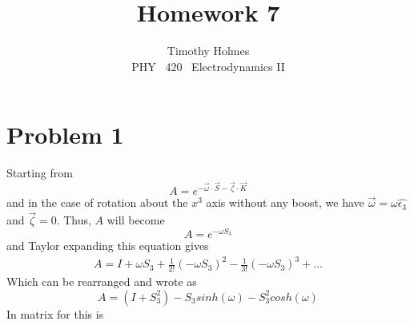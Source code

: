 \documentclass[11pt]{article}
\newcommand{\HWnum}{7}
\newcommand{\CourseNum}{420}           %
\newcommand{\Subject}{PHY}
\begin{document}

\title{Homework {\HWnum}}
\author{Timothy Holmes \\ \Subject ~ \CourseNum ~ Electrodynamics II}

\maketitle

\section*{Problem 1}

Starting from 
$$
A = e^{-\vec{\omega} \cdot \vec{S} - \vec{\zeta} \cdot \vec{K}}
$$
and in the case of rotation about the $x^{3}$ axis without any boost, we have $\vec{\omega} = \omega \hat{\epsilon_{3}}$ and $\vec{\zeta} = 0$. Thus, $A$ will become
$$
A = e^{-\omega S_{3}}
$$
and Taylor expanding this equation gives
\begin{align*}
    A = I + \omega S_{3} + \frac{1}{2!}(-\omega S_{3})^{2} - \frac{1}{3!}(-\omega S_{3})^{3} + ...
\end{align*}
Which can be rearranged and wrote as
$$
A = (I + S_{3}^{2}) - S_{3}sinh(\omega) - S_{3}^{2}cosh(\omega)
$$
In matrix for this is
\end{document}
